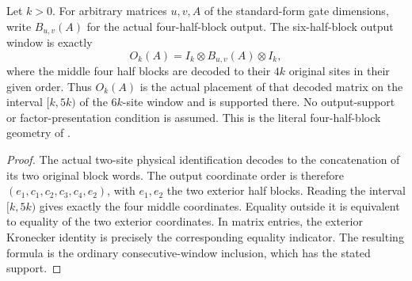 \begin{lemma}
    \label{lem:mpu_finite_heisenberg_middle_output_window}
    \leanok
    Let $k>0$. For arbitrary matrices $u,v,A$ of the standard-form gate
    dimensions, write $B_{u,v}(A)$ for the actual four-half-block output.
    The six-half-block output window is exactly
    \[
        O_k(A)=I_k\otimes B_{u,v}(A)\otimes I_k,
    \]
    where the middle four half blocks are decoded to their $4k$
    original sites in their given order. Thus $O_k(A)$ is the actual
    placement of that decoded matrix on the interval $[k,5k)$ of the
    $6k$-site window and is supported there. No output-support or
    factor-presentation condition is assumed. This is the literal
    four-half-block geometry of
    \cite[lines~603--622 and~2300--2334]{Cirac2017MPU}.
\end{lemma}
\begin{proof}\leanok
    The actual two-site physical identification decodes to the
    concatenation of its two original block words. The output coordinate
    order is therefore
    $(e_1,c_1,c_2,c_3,c_4,e_2)$, with $e_1,e_2$ the two exterior
    half blocks. Reading the interval $[k,5k)$ gives exactly the four
    middle coordinates. Equality outside it is equivalent to equality
    of the two exterior coordinates. In matrix entries, the exterior
    Kronecker identity is precisely the corresponding equality indicator.
    The resulting formula is the ordinary consecutive-window inclusion,
    which has the stated support.
\end{proof}


